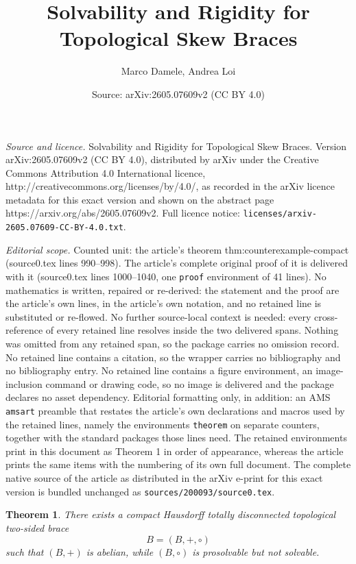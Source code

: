 \documentclass[10pt,a4paper]{amsart}
\title{Solvability and Rigidity for Topological Skew Braces}
\author{Marco Damele, Andrea Loi}
\date{Source: arXiv:2605.07609v2 (CC BY 4.0)}
\newtheorem{theorem}{Theorem}
\begin{document}
\maketitle

\noindent\emph{Source and licence.} Solvability and Rigidity for Topological Skew Braces. Version arXiv:2605.07609v2 (CC BY 4.0), distributed by arXiv under the Creative Commons Attribution 4.0 International licence, http://creativecommons.org/licenses/by/4.0/, as recorded in the arXiv licence metadata for this exact version and shown on the abstract page https://arxiv.org/abs/2605.07609v2. Full licence notice: \texttt{licenses/arxiv-2605.07609-CC-BY-4.0.txt}.\par\smallskip

\noindent\textit{Editorial scope.} Counted unit: the article's theorem thm:counterexample-compact (source0.tex lines 990--998). The article's complete original proof of it is delivered with it (source0.tex lines 1000--1040, one \texttt{proof} environment of 41 lines). No mathematics is written, repaired or re-derived: the statement and the proof are the article's own lines, in the article's own notation, and no retained line is substituted or re-flowed.  No further source-local context is needed: every cross-reference of every retained line resolves inside the two delivered spans.  Nothing was omitted from any retained span, so the package carries no omission record.  No retained line contains a citation, so the wrapper carries no bibliography and no bibliography entry.  No retained line contains a figure environment, an image-inclusion command or drawing code, so no image is delivered and the package declares no asset dependency.  Editorial formatting only, in addition: an AMS \texttt{amsart} preamble that restates the article's own declarations and macros used by the retained lines, namely the environments \texttt{theorem} on separate counters, together with the standard packages those lines need.  The retained environments print in this document as Theorem 1 in order of appearance, whereas the article prints the same items with the numbering of its own full document.  The complete native source of the article as distributed in the arXiv e-print for this exact version is bundled unchanged as \texttt{sources/200093/source0.tex}.
\begin{theorem}\label{thm:counterexample-compact}
There exists a compact Hausdorff totally disconnected topological two-sided
brace
\[
B=(B,+,\circ)
\]
such that $(B,+)$ is abelian, while $(B,\circ)$ is prosolvable but not
solvable.
\end{theorem}
\end{document}
